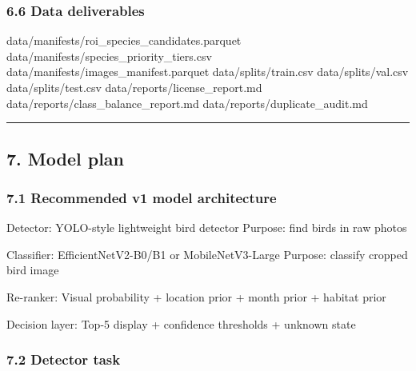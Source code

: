 \documentclass[
  11pt,
]{article}
\newenvironment{Shaded}{}{}
\newcommand{\NormalTok}[1]{#1}
\begin{document}
\subsubsection{6.6 Data deliverables}\label{data-deliverables}

\begin{Shaded}
\begin{Highlighting}[]
\NormalTok{data/manifests/roi\_species\_candidates.parquet}
\NormalTok{data/manifests/species\_priority\_tiers.csv}
\NormalTok{data/manifests/images\_manifest.parquet}
\NormalTok{data/splits/train.csv}
\NormalTok{data/splits/val.csv}
\NormalTok{data/splits/test.csv}
\NormalTok{data/reports/license\_report.md}
\NormalTok{data/reports/class\_balance\_report.md}
\NormalTok{data/reports/duplicate\_audit.md}
\end{Highlighting}
\end{Shaded}

\begin{center}\rule{0.5\linewidth}{0.5pt}\end{center}

\subsection{7. Model plan}\label{model-plan}

\subsubsection{7.1 Recommended v1 model
architecture}\label{recommended-v1-model-architecture}

\begin{Shaded}
\begin{Highlighting}[]
\NormalTok{Detector:}
\NormalTok{  YOLO{-}style lightweight bird detector}
\NormalTok{  Purpose: find birds in raw photos}

\NormalTok{Classifier:}
\NormalTok{  EfficientNetV2{-}B0/B1 or MobileNetV3{-}Large}
\NormalTok{  Purpose: classify cropped bird image}

\NormalTok{Re{-}ranker:}
\NormalTok{  Visual probability + location prior + month prior + habitat prior}

\NormalTok{Decision layer:}
\NormalTok{  Top{-}5 display + confidence thresholds + unknown state}
\end{Highlighting}
\end{Shaded}

\subsubsection{7.2 Detector task}\label{detector-task}
\end{document}
